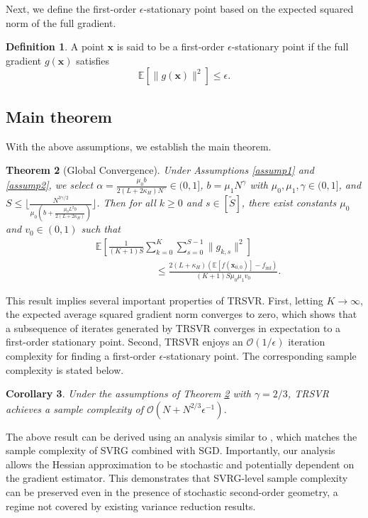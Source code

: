 \documentclass{article}
\newcommand{\bx}{\boldsymbol{x}}
\theoremstyle{plain}
\newtheorem{theorem}{Theorem}[section]
\newtheorem{corollary}[theorem]{Corollary}
\theoremstyle{definition}
\newtheorem{definition}[theorem]{Definition}
\theoremstyle{remark}
\begin{document}
Next, we define the first-order $\epsilon$-stationary point based on the expected squared norm of the full gradient.
\begin{definition}
   A point $\bx$ is said to be a first-order $\epsilon$-stationary point if the full gradient $g(\bx)$ satisfies 
   \begin{equation*}
       \mathbb{E}[\|g(\bx)\|^2]\leq \epsilon.   
    \end{equation*}
\end{definition}

\subsection{Main theorem}
With the above assumptions, we establish the main theorem.
\begin{theorem}[Global Convergence]\label{thm:Global Convergence_main}
Under Assumptions \ref{assump1} and \ref{assump2}, we select
$\alpha = \frac{\mu_0 b}{2(L+2\kappa_H)N^\gamma}\in(0,1]$,  $b =\mu_1  N^{\gamma}$ with $\mu_0,\mu_1,\gamma\in(0,1]$, and $S \leq \bigg\lfloor\frac{N^{3\gamma/2}}{\mu_0(b+\frac{\mu_0L^2b}{2(L+2\kappa_H)})}\bigg\rfloor$. Then for all $k\geq 0$ and $s\in [\tilde{S}]$, there exist constants $\mu_0$ and $v_0 \in (0, 1)$ such that
\begin{align*}
    & \mathbb{E}\left[\frac{1}{(K+1)S}\sum_{k=0}^K\sum_{s=0}^{S-1}\|g_{k,s}\|^2\right] \\
    & \qquad\qquad\qquad \leq \frac{2(L+\kappa_H) (\mathbb{E}[f(\bx_{0,0})] - f_{\inf})}{(K+1)S\mu_0 \mu_1  v_0}.
\end{align*}

\end{theorem}
This result implies several important properties of TRSVR. First, letting $K \to \infty$, the expected average squared gradient norm converges to zero, which shows that a subsequence of iterates generated by TRSVR converges in expectation to a first-order stationary point. Second, TRSVR enjoys an $\mathcal{O}(1/\epsilon)$ iteration complexity for finding a first-order $\epsilon$-stationary point. The corresponding sample complexity is stated below.

\begin{corollary}
Under the assumptions of Theorem \ref{thm:Global Convergence_main} with $\gamma = 2/3$, TRSVR achieves a sample complexity of $\mathcal{O}(N + N^{2/3}\epsilon^{-1})$.
\end{corollary}

The above result can be derived using an analysis similar to \citep[][Corollary~2]{Reddi2016Stochastic}, which matches the sample complexity of SVRG combined with SGD. Importantly, our analysis allows the Hessian approximation to be stochastic and potentially dependent on the gradient estimator. This demonstrates that SVRG-level sample complexity can be preserved even in the presence of stochastic second-order geometry, a regime not covered by existing variance reduction results.
\end{document}
